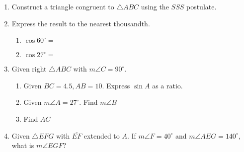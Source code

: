 \begin{enumerate}
\item Construct a triangle congruent to $\triangle ABC$ using the $SSS$ postulate.\\[2cm]

\item Express the result to the nearest thousandth.  \vspace{.5cm}
  \begin{multicols}{2}
    \begin{enumerate}
      \item $\cos 60^\circ = $
      \item $\cos 27^\circ = $
    \end{enumerate}
  \end{multicols} \vspace{0.25cm}

\item Given right $\triangle ABC$ with $m\angle C=90^\circ$.
  \begin{center}
     \vspace{.1cm}
  \end{center}
    \begin{enumerate}
      \item Given $BC=4.5, AB=10$. Express $\sin A$ as a ratio. \vspace{1cm}
      \item Given $m\angle A = 27^\circ$. Find $m\angle B$ \vspace{1cm}
      \item Find $AC$ \vspace{2cm}
    \end{enumerate}

\item Given  $\triangle EFG$ with $\overline{EF}$ extended to $A$. If $m\angle F=40^\circ$ and $m\angle AEG=140^\circ$, what is $m\angle EGF$?
  \begin{center}
  \end{center}


\end{enumerate}

